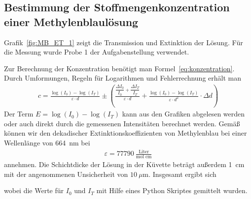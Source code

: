 \documentclass{article}
\begin{document}

%
%
%
%
%
%
%






\subsection{Bestimmung der Stoffmengenkonzentration einer Methylenblaulösung}

Grafik~\ref{fig:MB_ET_1} zeigt die Transmission und Extinktion der Lösung. Für die Messung wurde Probe 1 der Aufgabenstellung verwendet.

Zur Berechnung der Konzentration benötigt man Formel~\eqref{eq:konzentration}. Durch Umformungen, Regeln für Logarithmen und Fehlerrechnung erhält man
\begin{align*}
c = \frac{\log(I_0) - \log(I_T)}{\varepsilon\cdot d} \pm \left(\frac{\dfrac{\Delta I_0}{I_0} + \dfrac{\Delta I_T}{I_T}}{\varepsilon\cdot d} + \frac{\log(I_0) - \log(I_T)}{\varepsilon\cdot d^2} \cdot \Delta d\right)
\end{align*}
Der Term $E = \log(I_0) - \log(I_T)$ kann aus den Grafiken abgelesen werden oder auch direkt durch die gemessenen Intensitäten berechnet werden.
Gemäß \cite{moodle} können wir den  dekadischer Extinktionskoeffizienten von Methylenblau bei einer Wellenlänge von 664~nm bei
\begin{align*}
\varepsilon =  77790~\frac{\text{Liter}}{\text{mol~cm}}
\end{align*}
annehmen. Die Schichtdicke der Lösung in der Küvette beträgt außerdem 1~cm mit der angenommenen Unsicherheit von $10~\mu$m. Insgesamt ergibt sich 

wobei die Werte für $I_0$ und $I_T$ mit Hilfe eines Python Skriptes gemittelt wurden.
\end{document}
